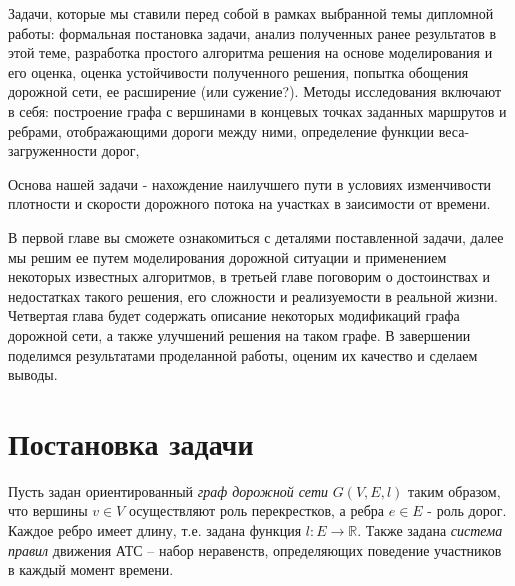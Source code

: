 \documentclass[12pt, a4paper]{article}
\begin{document}
Задачи, которые мы ставили перед собой в рамках выбранной темы дипломной работы: формальная постановка задачи, анализ полученных ранее результатов в этой теме, разработка простого алгоритма решения на основе моделирования и его оценка, оценка устойчивости полученного решения, попытка обощения дорожной сети, ее расширение (или сужение?). Методы исследования включают в себя: построение графа с вершинами в концевых точках заданных маршрутов и ребрами, отображающими дороги между ними, определение функции веса-загруженности дорог, 



Основа нашей задачи - нахождение наилучшего пути в условиях изменчивости плотности и скорости дорожного потока на участках в заисимости от времени.

В первой главе вы сможете ознакомиться с деталями поставленной задачи, далее мы решим ее путем моделирования дорожной ситуации и применением некоторых известных алгоритмов, в третьей главе поговорим о достоинствах и недостатках такого решения, его сложности и реализуемости в реальной жизни. Четвертая глава будет содержать описание некоторых модификаций графа дорожной сети, а также улучшений решения на таком графе. В завершении поделимся результатами проделанной работы, оценим их качество и сделаем выводы.




\newpage
\section{Постановка задачи}
Пусть задан ориентированный \textit{граф дорожной сети} $ G (V, E, l)$ таким образом, что вершины $ v \in V$ осуществляют роль перекрестков, а ребра $e \in E$ - роль дорог. Каждое ребро имеет длину, т.е. задана функция $l : E \rightarrow \mathbb {R} $. Также задана \textit{система правил} движения АТС -- набор неравенств, определяющих поведение участников в каждый момент времени.
\end{document}
